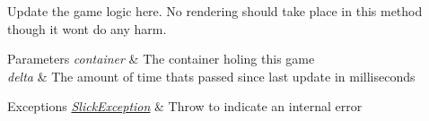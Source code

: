 Update the game logic here. No rendering should take place in this method though it won\textquotesingle{}t do any harm.


\begin{DoxyParams}{Parameters}
{\em container} & The container holing this game \\
\hline
{\em delta} & The amount of time thats passed since last update in milliseconds \\
\hline
\end{DoxyParams}

\begin{DoxyExceptions}{Exceptions}
{\em \mbox{\hyperlink{classorg_1_1newdawn_1_1slick_1_1_slick_exception}{Slick\+Exception}}} & Throw to indicate an internal error \\
\hline
\end{DoxyExceptions}


